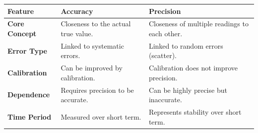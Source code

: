 \documentclass[12pt,a4paper]{article}
\renewcommand{\arraystretch}{1.45}
\begin{document}
\begin{tcolorbox}[tikzbox, title={Accuracy vs Precision Comparison Summary}]
\renewcommand{\arraystretch}{1.4}
\par\noindent
\begin{tabularx}{\linewidth}{|B{2.2cm}|>{\small\centering\arraybackslash}X|>{\small\centering\arraybackslash}X|}
\hline
\textbf{Feature} & \textbf{\color{myred}Accuracy} & \textbf{\color{myteal}Precision} \\
\hline
\textbf{Core Concept} & Closeness to the actual true value. & Closeness of multiple readings to each other. \\
\hline
\textbf{Error Type} & Linked to systematic errors. & Linked to random errors (scatter). \\
\hline
\textbf{Calibration} & Can be improved by calibration. & Calibration does not improve precision. \\
\hline
\textbf{Dependence} & Requires precision to be accurate. & Can be highly precise but inaccurate. \\
\hline
\textbf{Time Period} & Measured over short term. & Represents stability over short term. \\
\hline
\end{tabularx}
\end{tcolorbox}
\end{document}
